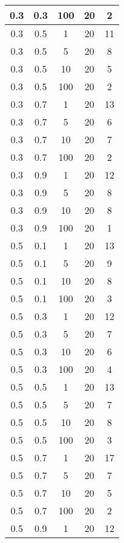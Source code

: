 \begin{appendices}
\begin{longtable}{|c|c|c|c|c|}
 0.3   & 0.3    & 100  & 20    & 2     \\ \hline
 0.3   & 0.5    & 1    & 20    & 11    \\ \hline
 0.3   & 0.5    & 5    & 20    & 8     \\ \hline
 0.3   & 0.5    & 10   & 20    & 5     \\ \hline
 0.3   & 0.5    & 100  & 20    & 2     \\ \hline
 0.3   & 0.7    & 1    & 20    & 13    \\ \hline
 0.3   & 0.7    & 5    & 20    & 6     \\ \hline
 0.3   & 0.7    & 10   & 20    & 7     \\ \hline
 0.3   & 0.7    & 100  & 20    & 2     \\ \hline
 0.3   & 0.9    & 1    & 20    & 12    \\ \hline
 0.3   & 0.9    & 5    & 20    & 8     \\ \hline
 0.3   & 0.9    & 10   & 20    & 8     \\ \hline
 0.3   & 0.9    & 100  & 20    & 1     \\ \hline
 0.5   & 0.1    & 1    & 20    & 13    \\ \hline
 0.5   & 0.1    & 5    & 20    & 9     \\ \hline
 0.5   & 0.1    & 10   & 20    & 8     \\ \hline
 0.5   & 0.1    & 100  & 20    & 3     \\ \hline
 0.5   & 0.3    & 1    & 20    & 12    \\ \hline
 0.5   & 0.3    & 5    & 20    & 7     \\ \hline
 0.5   & 0.3    & 10   & 20    & 6     \\ \hline
 0.5   & 0.3    & 100  & 20    & 4     \\ \hline
 0.5   & 0.5    & 1    & 20    & 13    \\ \hline
 0.5   & 0.5    & 5    & 20    & 7     \\ \hline
 0.5   & 0.5    & 10   & 20    & 8     \\ \hline
 0.5   & 0.5    & 100  & 20    & 3     \\ \hline
 0.5   & 0.7    & 1    & 20    & 17    \\ \hline
 0.5   & 0.7    & 5    & 20    & 7     \\ \hline
 0.5   & 0.7    & 10   & 20    & 5     \\ \hline
 0.5   & 0.7    & 100  & 20    & 2     \\ \hline
 0.5   & 0.9    & 1    & 20    & 12    \\ \hline

\end{longtable}
\end{appendices}
